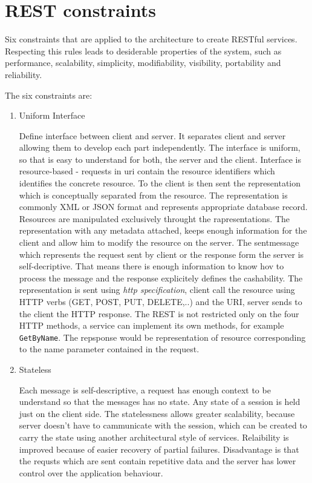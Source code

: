 \section{REST constraints}
\label{sec:constraints}

Six constraints that are applied to the architecture to create RESTful services. Respecting this rules leads to desiderable properties of the system, such as performance, scalability, simplicity, modifiability, visibility, portability and reliability. 
\begin{description}
  \item The six constraints are:
  

\begin{enumerate}
  \item Uniform Interface
  
Define interface between client and server. It separates client and server allowing them to develop each part independently. The interface is uniform, so that is easy to understand for both, the server and the client.
Interface is resource-based - requests in \gls{uri} contain the resource identifiers which identifies the concrete resource. To the client is then sent the representation which is conceptually separated from the resource. The representation is commonly XML or JSON format and represents appropriate database record.
Resources are manipulated exclusively throught the rapresentations. The representation with any metadata attached, keeps enough information for the client and allow him to modify the resource on the server.
The sentmessage which represents the request sent by client or the response form the server is self-decriptive. That means there is enough information to know hov to process the message and the response explicitely defines the cashability.
The representation is sent using \emph{\gls{http} specification}, client call the resource using HTTP verbs (GET, POST, PUT, DELETE,..) and the URI, server sends to the client the HTTP response.
The REST is not restricted only on the four HTTP methods, a service can implement its own methods, for example \texttt{GetByName}. The repsponse would be representation of resource corresponding to the name parameter contained in the request.

  \item Stateless
  
Each message is self-descriptive, a request has enough context to be understand so that the messages has no state. Any state of a \gls{session} is held just on the client side.
The statelessness allows greater scalability, because server doesn't have to cammunicate with the session, which can be created to carry the state using another architectural style of services. Relaibility is improved because of easier recovery of partial failures. Disadvantage is that the requsts which are sent contain repetitive data and the server has lower control over the application behaviour.


\end{enumerate}
\end{description}
